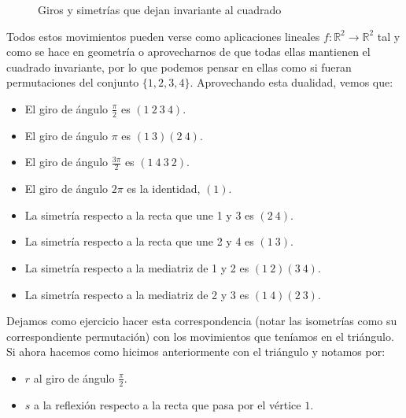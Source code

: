 \begin{ejemplo}
\begin{figure}
        \caption{Giros y simetrías que dejan invariante al cuadrado}
        \label{fig:inv_cuadrado}
    \end{figure}
    Todos estos movimientos pueden verse como aplicaciones lineales $f:\mathbb{R}^2\rightarrow\mathbb{R}^2$ tal y como se hace en geometría o aprovecharnos de que todas ellas mantienen el cuadrado invariante, por lo que podemos pensar en ellas como si fueran permutaciones del conjunto $\{1,2,3,4\}$. Aprovechando esta dualidad, vemos que:
    \begin{itemize}
        \item El giro de ángulo $\frac{\pi}{2}$ es $(1\ 2\ 3\ 4)$.
        \item El giro de ángulo $\pi$ es $(1\ 3)(2\ 4)$.
        \item El giro de ángulo $\frac{3\pi}{2}$ es $(1\ 4\ 3\ 2)$.
        \item El giro de ángulo $2\pi$ es la identidad, $(1)$.
        \item La simetría respecto a la recta que une 1 y 3 es $(2\ 4)$.
        \item La simetría respecto a la recta que une 2 y 4 es $(1\ 3)$.
        \item La simetría respecto a la mediatriz de 1 y 2 es $(1\ 2)(3\ 4)$.
        \item La simetría respecto a la mediatriz de 2 y 3 es $(1\ 4)(2\ 3)$.
    \end{itemize}
    Dejamos como ejercicio hacer esta correspondencia (notar las isometrías como su correspondiente permutación) con los movimientos que teníamos en el triángulo. Si ahora hacemos como hicimos anteriormente con el triángulo y notamos por:
    \begin{itemize}
        \item $r$ al giro de ángulo $\frac{\pi}{2}$.
        \item $s$ a la reflexión respecto a la recta que pasa por el vértice $1$.
    \end{itemize}

\end{ejemplo}
